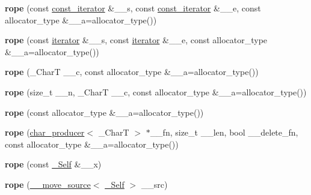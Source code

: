 \begin{DoxyCompactItemize}
\mbox{\label{classrope_aa2898b627b5adde05f52b1a73caf856d}} 
{\bfseries rope} (const \hyperlink{class___rope__const__iterator}{const\+\_\+iterator} \&\+\_\+\+\_\+s, const \hyperlink{class___rope__const__iterator}{const\+\_\+iterator} \&\+\_\+\+\_\+e, const allocator\+\_\+type \&\+\_\+\+\_\+a=allocator\+\_\+type())
\item 
\mbox{\label{classrope_aec0953ca4d57a5851a945a77a5ad62a1}} 
{\bfseries rope} (const \hyperlink{class___rope__iterator}{iterator} \&\+\_\+\+\_\+s, const \hyperlink{class___rope__iterator}{iterator} \&\+\_\+\+\_\+e, const allocator\+\_\+type \&\+\_\+\+\_\+a=allocator\+\_\+type())
\item 
\mbox{\label{classrope_a39914d0f0f0c624c00ed2d3b49fe3363}} 
{\bfseries rope} (\+\_\+\+CharT \+\_\+\+\_\+c, const allocator\+\_\+type \&\+\_\+\+\_\+a=allocator\+\_\+type())
\item 
\mbox{\label{classrope_a33ade5e98ff60bc502c02a293d84d49a}} 
{\bfseries rope} (size\+\_\+t \+\_\+\+\_\+n, \+\_\+\+CharT \+\_\+\+\_\+c, const allocator\+\_\+type \&\+\_\+\+\_\+a=allocator\+\_\+type())
\item 
\mbox{\label{classrope_ad41783eb7bb8252b2468eadff16f545b}} 
{\bfseries rope} (const allocator\+\_\+type \&\+\_\+\+\_\+a=allocator\+\_\+type())
\item 
\mbox{\label{classrope_ab3695a4927434694fd3703bee664799d}} 
{\bfseries rope} (\hyperlink{classchar__producer}{char\+\_\+producer}$<$ \+\_\+\+CharT $>$ $\ast$\+\_\+\+\_\+fn, size\+\_\+t \+\_\+\+\_\+len, bool \+\_\+\+\_\+delete\+\_\+fn, const allocator\+\_\+type \&\+\_\+\+\_\+a=allocator\+\_\+type())
\item 
\mbox{\label{classrope_a6584cff2172d262f36ec934f0b912e6e}} 
{\bfseries rope} (const \hyperlink{classrope}{\+\_\+\+Self} \&\+\_\+\+\_\+x)
\item 
\mbox{\label{classrope_a8ce344727a57e71c2dc96810090fa2ec}} 
{\bfseries rope} (\hyperlink{class____move__source}{\+\_\+\+\_\+move\+\_\+source}$<$ \hyperlink{classrope}{\+\_\+\+Self} $>$ \+\_\+\+\_\+src)
\item 
\mbox{\label{classrope_a7ebc2545928948857d84f4bfd879b6bf}} 

\end{DoxyCompactItemize}
